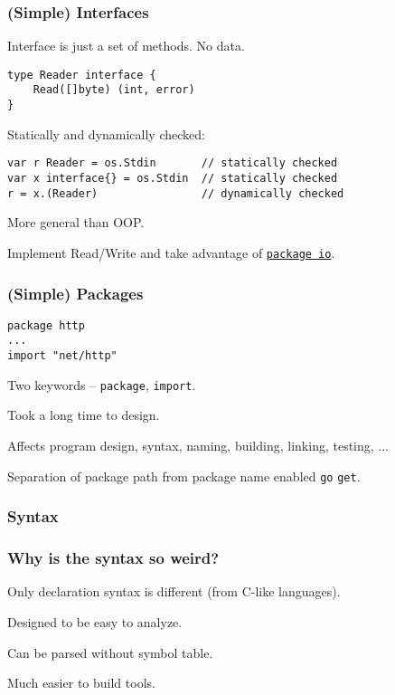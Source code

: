 \documentclass[9pt]{beamer}
\newcommand{\myblue} [1] {{\color{blue}#1}}
\begin{document}
\begin{frame}[fragile]
\frametitle{(Simple) Interfaces}


Interface is just a set of methods. No data.



\begin{verbatim}
type Reader interface {
    Read([]byte) (int, error)
}

\end{verbatim}


Statically and dynamically checked:



\begin{verbatim}
var r Reader = os.Stdin       // statically checked
var x interface{} = os.Stdin  // statically checked
r = x.(Reader)                // dynamically checked

\end{verbatim}


More general than OOP.


Implement Read/Write and take advantage of \myblue{\href{https://golang.org/pkg/io/}{\texttt{package io}}}.



\end{frame}

\begin{frame}[fragile]
\frametitle{(Simple) Packages}



\begin{verbatim}
package http
...
import "net/http"

\end{verbatim}


Two keywords – \texttt{package}, \texttt{import}.


Took a long time to design.


Affects program design, syntax, naming, building, linking, testing, ...


Separation of package path from package name enabled \texttt{go} \texttt{get}.



\end{frame}

\begin{frame}[fragile]
\frametitle{Syntax}


\end{frame}

\begin{frame}[fragile]
\frametitle{Why is the syntax so weird?}


Only declaration syntax is different (from C-like languages).


Designed to be easy to analyze.


Can be parsed without symbol table.


Much easier to build tools.



\end{frame}
\end{document}
